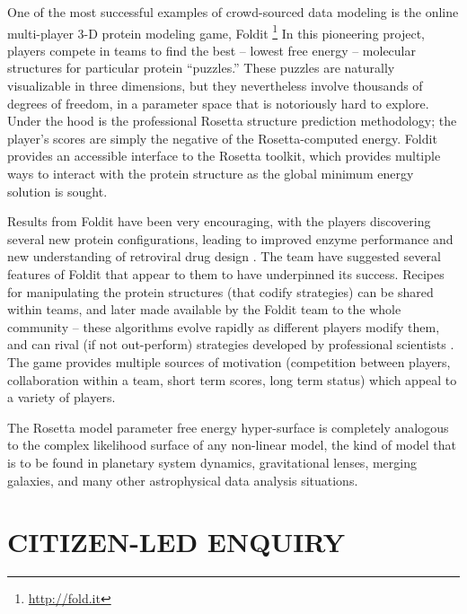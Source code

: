 \documentclass{ar2e}
\begin{document}
% 

One of the most successful examples of crowd-sourced data modeling is the
online multi-player 3-D protein modeling game,  Foldit
\citep{Cooper++2010}\footnote{\url{http://fold.it}} In this pioneering
project, players compete in teams to find the best -- lowest free energy --
molecular structures for particular protein ``puzzles.'' 
These puzzles are naturally visualizable in three dimensions, but 
they nevertheless involve thousands of degrees of freedom, in a parameter
space that is notoriously hard to explore.
Under the hood is the
professional Rosetta structure prediction methodology; the player's scores are
simply the negative of the Rosetta-computed energy. Foldit provides an
accessible interface to the Rosetta toolkit, which provides multiple ways to
interact with the protein structure as the global minimum energy solution is
sought. 

Results from Foldit have been very encouraging, with the players discovering
several new protein configurations, leading to improved enzyme performance 
\citep{Eiben++2012} and new understanding of retroviral drug design
\citep{Khatib++2011a}. The team have suggested several features of Foldit that
appear to them to have underpinned its success. Recipes for manipulating the
protein structures (that codify strategies) can be shared within teams, and
later made available by the Foldit team to the whole community -- these
algorithms evolve rapidly as different players modify them, and can rival (if
not out-perform) strategies developed by professional scientists 
\citep{Khatib++2011b}. The game provides multiple sources of motivation
(competition between players, collaboration within a team, short term scores,
long term status) which appeal to a variety of players. 

The Rosetta model parameter free energy hyper-surface is completely analogous
to the complex likelihood surface of any non-linear model, the kind of model
that is to be found in planetary system dynamics, gravitational lenses,
merging galaxies, and many other astrophysical data analysis situations. 



\section{CITIZEN-LED ENQUIRY}
\label{sec:explore}
\end{document}
